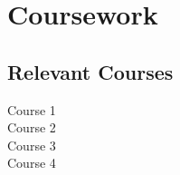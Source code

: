 \documentclass[]{hanisntsolo-resume}
\begin{document}
\begin{minipage}[t]{0.33\textwidth}
\sectionsep


\section{Coursework}
\subsection{Relevant Courses}
Course 1 \\
Course 2 \\
Course 3 \\
Course 4

\sectionsep

\end{minipage}
\hfill
\end{document}
